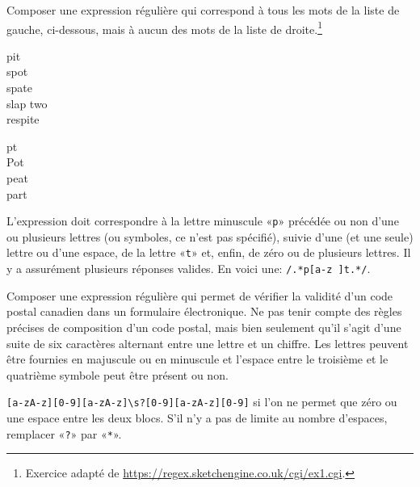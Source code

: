 \begin{exercice}
  Composer une expression régulière qui correspond à tous les mots de
  la liste de gauche, ci-dessous, mais à aucun des mots de la liste de
  droite.\footnote{%
    Exercice adapté de
    \url{https://regex.sketchengine.co.uk/cgi/ex1.cgi}.}
  \begin{center}
    \begin{minipage}[t]{0.3\linewidth}
      pit \\
      spot \\
      spate \\
      slap two \\
      respite
    \end{minipage}
    \begin{minipage}[t]{0.3\linewidth}
      pt \\
      Pot \\
      peat \\
      part
    \end{minipage}
  \end{center}
  \begin{sol}
    L'expression doit correspondre à la lettre minuscule «\verb=p=»
    précédée ou non d'une ou plusieurs lettres (ou symboles, ce n'est
    pas spécifié), suivie d'une (et une seule) lettre ou d'une espace,
    de la lettre «\verb=t=» et, enfin, de zéro ou de plusieurs
    lettres. Il y a assurément plusieurs réponses valides. En voici
    une: \verb=/.*p[a-z ]t.*/=.
  \end{sol}

\end{exercice}

\begin{exercice}
  Composer une expression régulière qui permet de vérifier la validité
  d'un code postal canadien dans un formulaire électronique. Ne pas
  tenir compte des règles précises de composition d'un code postal,
  mais bien seulement qu'il s'agit d'une suite de six caractères
  alternant entre une lettre et un chiffre. Les lettres peuvent être
  fournies en majuscule ou en minuscule et l'espace entre le troisième
  et le quatrième symbole peut être présent ou non.
  \begin{sol}
    \verb=[a-zA-z][0-9][a-zA-z]\s?[0-9][a-zA-z][0-9]= si l'on ne
    permet que zéro ou une espace entre les deux blocs. S'il n'y a pas
    de limite au nombre d'espaces, remplacer «\verb=?=» par
    «\verb=*=».
  \end{sol}
\end{exercice}

